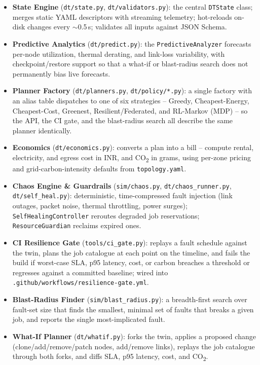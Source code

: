 \documentclass[12pt,a4]{report}
\begin{document}
\begin{itemize}
    \item \textbf{State Engine} (\texttt{dt/state.py}, \texttt{dt/validators.py}): the central \texttt{DTState} class; merges static YAML descriptors with streaming telemetry; hot-reloads on-disk changes every $\sim$0.5\,s; validates all inputs against JSON Schema.
    \item \textbf{Predictive Analytics} (\texttt{dt/predict.py}): the \texttt{PredictiveAnalyzer} forecasts per-node utilization, thermal derating, and link-loss variability, with checkpoint/restore support so that a what-if or blast-radius search does not permanently bias live forecasts.
    \item \textbf{Planner Factory} (\texttt{dt/planners.py}, \texttt{dt/policy/*.py}): a single factory with an alias table dispatches to one of six strategies -- Greedy, Cheapest-Energy, Cheapest-Cost, Greenest, Resilient/Federated, and RL-Markov (MDP) -- so the API, the CI gate, and the blast-radius search all describe the same planner identically.
    \item \textbf{Economics} (\texttt{dt/economics.py}): converts a plan into a bill -- compute rental, electricity, and egress cost in INR, and CO\textsubscript{2} in grams, using per-zone pricing and grid-carbon-intensity defaults from \texttt{topology.yaml}.
    \item \textbf{Chaos Engine \& Guardrails} (\texttt{sim/chaos.py}, \texttt{dt/chaos\_runner.py}, \texttt{dt/self\_heal.py}): deterministic, time-compressed fault injection (link outages, packet noise, thermal throttling, power surges); \texttt{SelfHealingController} reroutes degraded job reservations; \texttt{ResourceGuardian} reclaims expired ones.
    \item \textbf{CI Resilience Gate} (\texttt{tools/ci\_gate.py}): replays a fault schedule against the twin, plans the job catalogue at each point on the timeline, and fails the build if worst-case SLA, p95 latency, cost, or carbon breaches a threshold or regresses against a committed baseline; wired into \texttt{.github/workflows/resilience-gate.yml}.
    \item \textbf{Blast-Radius Finder} (\texttt{sim/blast\_radius.py}): a breadth-first search over fault-set size that finds the smallest, minimal set of faults that breaks a given job, and reports the single most-implicated fault.
    \item \textbf{What-If Planner} (\texttt{dt/whatif.py}): forks the twin, applies a proposed change (clone/add/remove/patch nodes, add/remove links), replays the job catalogue through both forks, and diffs SLA, p95 latency, cost, and CO\textsubscript{2}.

\end{itemize}
\end{document}

